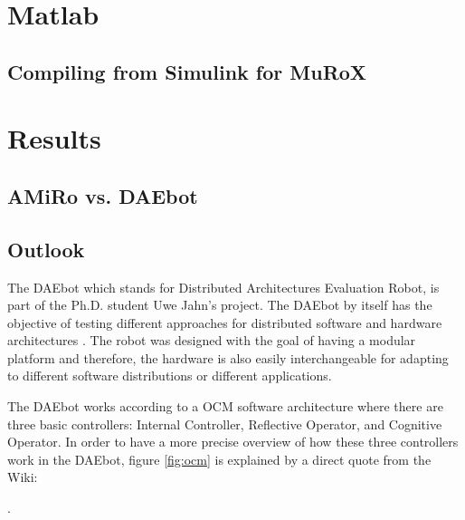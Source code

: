 \documentclass[12pt]{report}%
\begin{document}
\chapter{Matlab}
\section{Compiling from Simulink for MuRoX}

\chapter{Results}
\section{AMiRo vs. DAEbot}

\section{Outlook}

\iffalse
The DAEbot which stands for Distributed Architectures Evaluation Robot, is part of the Ph.D. student Uwe Jahn's project. The DAEbot by itself has the objective of testing different approaches for distributed software and hardware architectures \cite{DAEbot_Wiki}. The robot was designed with the goal of having a modular platform and therefore, the hardware is also easily interchangeable for adapting to different software distributions or different applications\cite{DAEbot_Wiki}.

The DAEbot works according to a OCM \cite{ocmAuto} software architecture where there are three basic controllers: Internal Controller, Reflective Operator, and Cognitive Operator. In order to have a more precise overview of how these three controllers work in the DAEbot, figure \ref{fig:ocm} is explained by a direct quote from the Wiki:

\cite{DAEbot_Wiki}.
\end{document}
